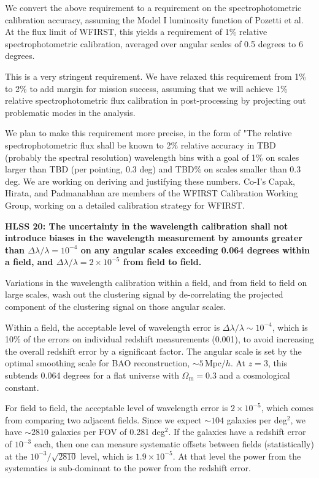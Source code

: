  We convert the above requirement to a requirement on the spectrophotometric
 calibration accuracy, assuming the Model I luminosity function of Pozetti et al.
 At the flux limit of WFIRST, this yields a requirement of 1\% relative
 spectrophotometric calibration, averaged over angular scales of 0.5 degrees to 6
 degrees.

 This is a very stringent requirement. We have relaxed this requirement from 1\%
 to 2\% to add margin for mission success, assuming that we will achieve 1\%
 relative spectrophotometric flux calibration in post-processing by projecting
 out problematic modes in the analysis.

 We plan to make this requirement more precise, in the form of "The relative
 spectrophotometric flux shall be known to 2\% relative accuracy in TBD (probably
 the spectral resolution) wavelength bins with a goal of 1\% on scales larger
 than TBD (per pointing, 0.3 deg) and TBD\% on scales smaller than 0.3 deg.
 We are working on deriving and justifying these numbers.
 Co-I's Capak, Hirata, and Padmanabhan are members of the WFIRST Calibration Working Group,
 working on a detailed calibration strategy for WFIRST.


 \noindent
 {\bf HLSS 20: The uncertainty in the wavelength calibration shall not introduce
 biases in the wavelength measurement by amounts greater than
 $\Delta\lambda/\lambda = 10^{-4}$ on any
 angular scales exceeding 0.064 degrees within a field, and
 $\Delta\lambda/\lambda = 2\times10^{-5}$ from
 field to field. }

 Variations in the wavelength calibration within a field, and from field to field
 on large scales, wash out the clustering signal by de-correlating the projected
 component of the clustering signal on those angular scales.

 Within a field, the acceptable level of wavelength error is
 $\Delta\lambda/\lambda \sim 10^{-4}$, which
 is 10\% of the errors on individual redshift measurements (0.001), to avoid
 increasing the overall redshift error by a significant factor. The angular scale
 is set by the optimal smoothing scale for BAO reconstruction, $\sim 5 \,
 \mathrm{Mpc}/h$. At $z=3$, this subtends 0.064 degrees for a flat universe with
 $\Omega_\mathrm{m}=0.3$ and a cosmological constant.

 For field to field, the acceptable level of wavelength error is $2\times10^{-5}$, which
 comes from comparing two adjacent fields.  Since we expect $\sim 104$ galaxies per
 deg$^2$, we have $\sim 2810$ galaxies per FOV of 0.281 deg$^2$.  If the galaxies have a
 redshift error of $10^{-3}$ each, then one can measure systematic offsets between
 fields (statistically) at the $10^{-3}/\sqrt{2810}$ level, which is
 $1.9\times10^{-5}$. At that level the power from the systematics is sub-dominant
 to the power from the redshift error.

